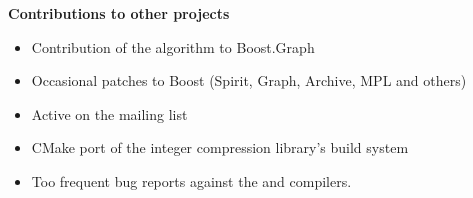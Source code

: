 \documentclass[10pt]{moderncv}
\newcommand{\myhref}[3][blue]{\href{#2}{\color{#1}{#3}}}
\begin{document}
\cvline{}
{\textbf{Contributions to other projects}
\begin{itemize}
    \item Contribution of the \myhref{http://www.boost.org/doc/libs/release/libs/graph/doc/hawick_circuits.html}{hawick\_circuits} algorithm to Boost.Graph
    \item Occasional patches to Boost (Spirit, Graph, Archive, MPL and others)
    \item Active on the \myhref{http://news.gmane.org/gmane.comp.lib.boost.devel}{Boost.Dev} mailing list
    \item CMake port of the \myhref{http://github.com/lemire/FastPFor}{FastPFor}
          integer compression library's build system
    \item Too frequent bug reports against the \myhref{https://goo.gl/y9pYWP}{Clang}
          and \myhref{https://goo.gl/IhKUrK}{GCC} compilers.
\end{itemize}}
\end{document}
